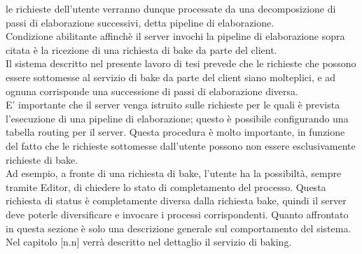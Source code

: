 le richieste dell’utente verranno dunque processate da una decomposizione di passi di elaborazione successivi, detta pipeline di elaborazione. 
\\
Condizione abilitante affinchè il server invochi la pipeline di elaborazione sopra citata è la ricezione di una richiesta di bake da parte del client.
\\ 
Il sistema descritto nel presente lavoro di tesi prevede che le richieste che possono essere sottomesse al servizio di bake da parte del client siano molteplici, e ad ognuna corrisponde una successione di passi di elaborazione diversa.
\\ 
E’ importante che il server venga istruito sulle richieste per le quali è prevista l’esecuzione di una pipeline di elaborazione; questo è possibile configurando una tabella routing per il server. Questa procedura è molto importante, in funzione del fatto che le richieste sottomesse dall’utente possono non essere esclusivamente richieste di bake. 
\\
Ad esempio, a fronte di una richiesta di bake, l’utente ha la possibiltà, sempre tramite Editor, di chiedere lo stato di completamento del processo. Questa richiesta di status è completamente diversa dalla richiesta bake, quindi il server deve poterle diversificare e invocare i processi corrispondenti. Quanto affrontato in questa sezione è solo una descrizione generale sul comportamento del sistema. Nel capitolo [n.n] verrà descritto nel dettaglio il servizio di baking.